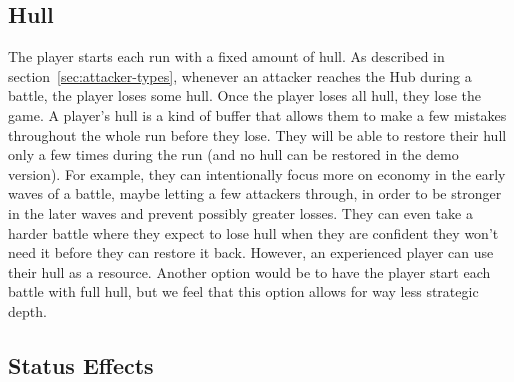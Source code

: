 \subsection{Hull}\label{sec:design-hull}

The player starts each run with a fixed amount of hull.
As described in section~\ref{sec:attacker-types}, whenever an attacker reaches the Hub during a battle, the player loses some hull.
Once the player loses all hull, they lose the game.
A player's hull is a kind of buffer that allows them to make a few mistakes throughout the whole run before they lose.
They will be able to restore their hull only a few times during the run (and no hull can be restored in the demo version).
For example, they can intentionally focus more on economy in the early waves of a battle, maybe letting a few attackers through, in order to be stronger in the later waves and prevent possibly greater losses.
They can even take a harder battle where they expect to lose hull when they are confident they won't need it before they can restore it back.
However, an experienced player can use their hull as a resource.
Another option would be to have the player start each battle with full hull, but we feel that this option allows for way less strategic depth.

\pagebreak

\subsection{Status Effects}

